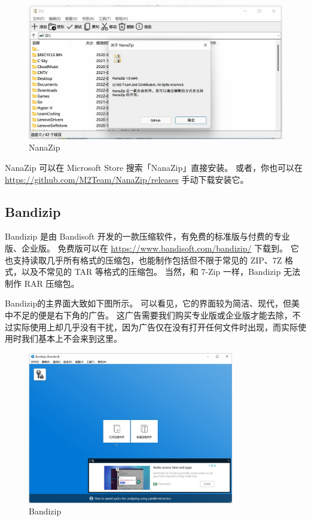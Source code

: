 \begin{figure}[htb!]
  \centering
  \includegraphics[width=.85\textwidth]{assets/NanaZip.jpg}
  \caption{NanaZip}
  \label{NanaZip}
\end{figure}

NanaZip 可以在 Microsoft Store 搜索「NanaZip」直接安装。
或者，你也可以在 \url{https://github.com/M2Team/NanaZip/releases} 手动下载安装它。

\subsection{Bandizip}

Bandizip 是由 Bandisoft 开发的一款压缩软件，有免费的标准版与付费的专业版、企业版。
免费版可以在 \url{https://www.bandisoft.com/bandizip/} 下载到。
它也支持读取几乎所有格式的压缩包，也能制作包括但不限于常见的 ZIP、7Z 格式，以及不常见的 TAR 等格式的压缩包。
当然，和 7-Zip 一样，Bandizip 无法制作 RAR 压缩包。

Bandizip的主界面大致如下图所示。
可以看见，它的界面较为简洁、现代，但美中不足的便是右下角的广告。
这广告需要我们购买专业版或企业版才能去除，不过实际使用上却几乎没有干扰，因为广告仅在没有打开任何文件时出现，而实际使用时我们基本上不会来到这里。

\begin{figure}[htb!]
  \centering
  \includegraphics[width=9cm]{assets/Bandizip.jpg}
  \caption{Bandizip}
  \label{Bandizip}
\end{figure}

